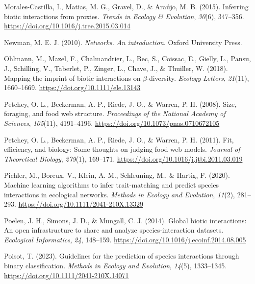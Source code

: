 \documentclass[
]{article}
\newlength{\cslhangindent}
\newenvironment{CSLReferences}[2] %
 {\begin{list}{}{%
  \setlength{\itemindent}{0pt}
  \setlength{\leftmargin}{0pt}
  \setlength{\parsep}{0pt}
  \ifodd #1
   \setlength{\leftmargin}{\cslhangindent}
   \setlength{\itemindent}{-1\cslhangindent}
  \fi
  \setlength{\itemsep}{#2\baselineskip}}}
 {\end{list}}
\begin{document}
\begin{CSLReferences}{1}{0}
Morales-Castilla, I., Matias, M. G., Gravel, D., \& Araújo, M. B.
(2015). Inferring biotic interactions from proxies. \emph{Trends in
Ecology \& Evolution}, \emph{30}(6), 347--356.
\url{https://doi.org/10.1016/j.tree.2015.03.014}

Newman, M. E. J. (2010). \emph{Networks. {An} introduction}. Oxford
University Press.

Ohlmann, M., Mazel, F., Chalmandrier, L., Bec, S., Coissac, E., Gielly,
L., Pansu, J., Schilling, V., Taberlet, P., Zinger, L., Chave, J., \&
Thuiller, W. (2018). Mapping the imprint of biotic interactions on
{\(\beta\)}-diversity. \emph{Ecology Letters}, \emph{21}(11),
1660--1669. \url{https://doi.org/10.1111/ele.13143}

Petchey, O. L., Beckerman, A. P., Riede, J. O., \& Warren, P. H. (2008).
Size, foraging, and food web structure. \emph{Proceedings of the
National Academy of Sciences}, \emph{105}(11), 4191--4196.
\url{https://doi.org/10.1073/pnas.0710672105}

Petchey, O. L., Beckerman, A. P., Riede, J. O., \& Warren, P. H. (2011).
Fit, efficiency, and biology: {Some} thoughts on judging food web
models. \emph{Journal of Theoretical Biology}, \emph{279}(1), 169--171.
\url{https://doi.org/10.1016/j.jtbi.2011.03.019}

Pichler, M., Boreux, V., Klein, A.-M., Schleuning, M., \& Hartig, F.
(2020). Machine learning algorithms to infer trait-matching and predict
species interactions in ecological networks. \emph{Methods in Ecology
and Evolution}, \emph{11}(2), 281--293.
\url{https://doi.org/10.1111/2041-210X.13329}

Poelen, J. H., Simons, J. D., \& Mungall, C. J. (2014). Global biotic
interactions: {An} open infrastructure to share and analyze
species-interaction datasets. \emph{Ecological Informatics}, \emph{24},
148--159. \url{https://doi.org/10.1016/j.ecoinf.2014.08.005}

Poisot, T. (2023). Guidelines for the prediction of species interactions
through binary classification. \emph{Methods in Ecology and Evolution},
\emph{14}(5), 1333--1345. \url{https://doi.org/10.1111/2041-210X.14071}


\end{CSLReferences}
\end{document}

